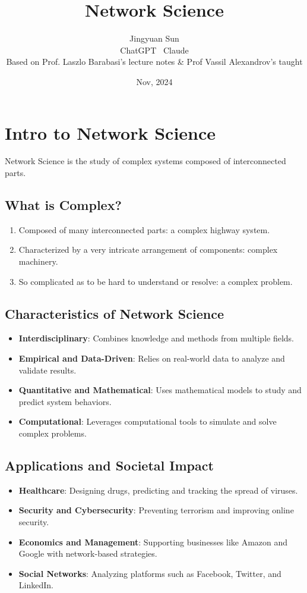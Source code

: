 \documentclass{article}
\title{\textbf{Network Science}}
\author{Jingyuan Sun \\ ChatGPT \ Claude \\ Based on Prof. Laszlo Barabasi’s lecture notes & Prof Vassil Alexandrov's taught}
\date{Nov, 2024}
\begin{document}
\maketitle

\section{Intro to Network Science}
Network Science is the study of complex systems composed of interconnected parts.

\subsection{What is Complex?}
\begin{enumerate}
    \item Composed of many interconnected parts: a complex highway system.
    \item Characterized by a very intricate arrangement of components: complex machinery.
    \item So complicated as to be hard to understand or resolve: a complex problem.
\end{enumerate}

\subsection{Characteristics of Network Science}

\begin{itemize}
    \item \textbf{Interdisciplinary}: Combines knowledge and methods from multiple fields.
    \item \textbf{Empirical and Data-Driven}: Relies on real-world data to analyze and validate results.
    \item \textbf{Quantitative and Mathematical}: Uses mathematical models to study and predict system behaviors.
    \item \textbf{Computational}: Leverages computational tools to simulate and solve complex problems.
\end{itemize}

\subsection{Applications and Societal Impact}

\begin{itemize}
    \item \textbf{Healthcare}: Designing drugs, predicting and tracking the spread of viruses.
    \item \textbf{Security and Cybersecurity}: Preventing terrorism and improving online security.
    \item \textbf{Economics and Management}: Supporting businesses like Amazon and Google with network-based strategies.
    \item \textbf{Social Networks}: Analyzing platforms such as Facebook, Twitter, and LinkedIn.
\end{itemize}
\end{document}
